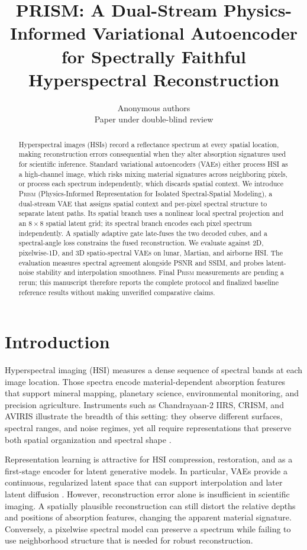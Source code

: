 \documentclass{article}
\title{PRISM: A Dual-Stream Physics-Informed Variational Autoencoder for Spectrally Faithful Hyperspectral Reconstruction}
\author{Anonymous authors \\ Paper under double-blind review}
\newcommand{\prism}{\textsc{Prism}}
\begin{document}
\maketitle

\begin{abstract}
Hyperspectral images (HSIs) record a reflectance spectrum at every spatial location, making reconstruction errors consequential when they alter absorption signatures used for scientific inference. Standard variational autoencoders (VAEs) either process HSI as a high-channel image, which risks mixing material signatures across neighboring pixels, or process each spectrum independently, which discards spatial context. We introduce \prism{} (Physics-Informed Representation for Isolated Spectral-Spatial Modeling), a dual-stream VAE that assigns spatial context and per-pixel spectral structure to separate latent paths. Its spatial branch uses a nonlinear local spectral projection and an $8\times8$ spatial latent grid; its spectral branch encodes each pixel spectrum independently. A spatially adaptive gate late-fuses the two decoded cubes, and a spectral-angle loss constrains the fused reconstruction. We evaluate against 2D, pixelwise-1D, and 3D spatio-spectral VAEs on lunar, Martian, and airborne HSI. The evaluation measures spectral agreement alongside PSNR and SSIM, and probes latent-noise stability and interpolation smoothness. Final \prism{} measurements are pending a rerun; this manuscript therefore reports the complete protocol and finalized baseline reference results without making unverified comparative claims.
\end{abstract}

\section{Introduction}

Hyperspectral imaging (HSI) measures a dense sequence of spectral bands at each image location. Those spectra encode material-dependent absorption features that support mineral mapping, planetary science, environmental monitoring, and precision agriculture. Instruments such as Chandrayaan-2 IIRS, CRISM, and AVIRIS illustrate the breadth of this setting: they observe different surfaces, spectral ranges, and noise regimes, yet all require representations that preserve both spatial organization and spectral shape \citep{chowdhury2020iirs,murchie2007crism,green1998aviris}.

Representation learning is attractive for HSI compression, restoration, and as a first-stage encoder for latent generative models. In particular, VAEs provide a continuous, regularized latent space that can support interpolation and later latent diffusion \citep{kingma2014vae,rombach2022ldm}. However, reconstruction error alone is insufficient in scientific imaging. A spatially plausible reconstruction can still distort the relative depths and positions of absorption features, changing the apparent material signature. Conversely, a pixelwise spectral model can preserve a spectrum while failing to use neighborhood structure that is needed for robust reconstruction.
\end{document}
